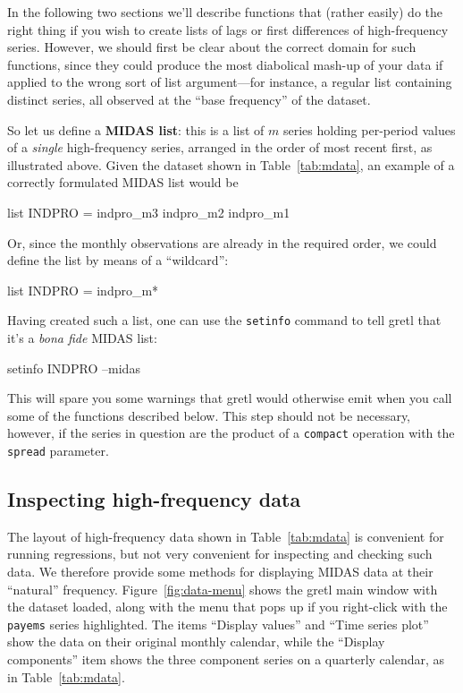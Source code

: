 In the following two sections we'll describe functions that (rather
easily) do the right thing if you wish to create lists of lags or
first differences of high-frequency series. However, we should first
be clear about the correct domain for such functions, since they could
produce the most diabolical mash-up of your data if applied to the
wrong sort of list argument---for instance, a regular list containing
distinct series, all observed at the ``base frequency'' of the
dataset.

So let us define a \textbf{MIDAS list}: this is a list of $m$ series
holding per-period values of a \textit{single} high-frequency series,
arranged in the order of most recent first, as illustrated
above. Given the dataset shown in Table~\ref{tab:mdata}, an example
of a correctly formulated MIDAS list would be
%
\begin{code}
list INDPRO = indpro_m3 indpro_m2 indpro_m1
\end{code}
%
Or, since the monthly observations are already in the required order,
we could define the list by means of a ``wildcard'':
%
\begin{code}
list INDPRO = indpro_m*
\end{code}

Having created such a list, one can use the \texttt{setinfo} command
to tell gretl that it's a \textit{bona fide} MIDAS list:
%
\begin{code}
setinfo INDPRO --midas
\end{code}
%
This will spare you some warnings that gretl would otherwise emit when
you call some of the functions described below. This step should not
be necessary, however, if the series in question are the product of a
\texttt{compact} operation with the \texttt{spread} parameter.

\subsection{Inspecting high-frequency data}

The layout of high-frequency data shown in Table~\ref{tab:mdata} is
convenient for running regressions, but not very convenient for
inspecting and checking such data. We therefore provide some methods
for displaying MIDAS data at their ``natural''
frequency. Figure~\ref{fig:data-menu} shows the gretl main window with
the  dataset loaded, along with the menu that pops
up if you right-click with the \texttt{payems} series highlighted.
The items ``Display values'' and ``Time series plot'' show the data
on their original monthly calendar, while the ``Display components''
item shows the three component series on a quarterly calendar, as
in Table~\ref{tab:mdata}.

